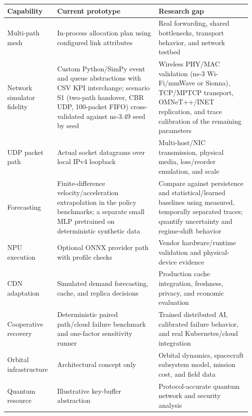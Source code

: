 \documentclass[
  american,
  11pt,
]{article}
\newcounter{none} %
\begin{document}
{\def\LTcaptype{none} %
\begin{longtable}[]{@{}
  >{\raggedright\arraybackslash}p{}
  >{\raggedright\arraybackslash}p{}
  >{\raggedright\arraybackslash}p{}@{}}
\toprule\noalign{}
\begin{minipage}[b]{\linewidth}\raggedright
Capability
\end{minipage} & \begin{minipage}[b]{\linewidth}\raggedright
Current prototype
\end{minipage} & \begin{minipage}[b]{\linewidth}\raggedright
Research gap
\end{minipage} \\
\midrule\noalign{}
\endhead
\bottomrule\noalign{}
\endlastfoot
Multi-path mesh & In-process allocation plan using configured link
attributes & Real forwarding, shared bottlenecks, transport behavior,
and network testbed \\
Network simulator fidelity & Custom Python/SimPy event and queue
abstractions with CSV KPI interchange; scenario S1 (two-path handover,
CBR UDP, 100-packet FIFO) cross-validated against ns-3.49 seed by seed &
Wireless PHY/MAC validation (ns-3 Wi-Fi/mmWave or Sionna), TCP/MPTCP
transport, OMNeT++/INET replication, and trace calibration of the
remaining parameters \\
UDP packet path & Actual socket datagrams over local IPv4 loopback &
Multi-host/NIC transmission, physical media, loss/reorder emulation, and
scale \\
Forecasting & Finite-difference velocity/acceleration extrapolation in
the policy benchmarks; a separate small MLP pretrained on deterministic
synthetic data & Compare against persistence and statistical/learned
baselines using measured, temporally separated traces; quantify
uncertainty and regime-shift behavior \\
NPU execution & Optional ONNX provider path with profile checks & Vendor
hardware/runtime validation and physical-device evidence \\
CDN adaptation & Simulated demand forecasting, cache, and replica
decisions & Production cache integration, freshness, privacy, and
economic evaluation \\
Cooperative recovery & Deterministic paired path/cloud failure benchmark
and one-factor sensitivity runner & Trained distributed AI, calibrated
failure behavior, and real Kubernetes/cloud integration \\
Orbital infrastructure & Architectural concept only & Orbital dynamics,
spacecraft subsystem model, mission cost, and field data \\
Quantum resource & Illustrative key-buffer abstraction &
Protocol-accurate quantum network and security analysis \\
\end{longtable}
}
\end{document}
